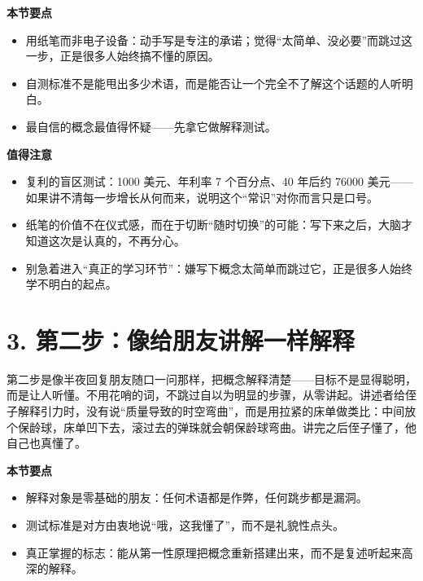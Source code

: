 \documentclass[UTF8,a4paper,11pt]{ctexart}
\begin{document}
\begin{keyconcept}
\textbf{本节要点}
\begin{itemize}
  \item 用纸笔而非电子设备：动手写是专注的承诺；觉得“太简单、没必要”而跳过这一步，正是很多人始终搞不懂的原因。
  \item 自测标准不是能甩出多少术语，而是能否让一个完全不了解这个话题的人听明白。
  \item 最自信的概念最值得怀疑——先拿它做解释测试。
\end{itemize}
\end{keyconcept}

\begin{keyconcept}
\textbf{值得注意}
\begin{itemize}
  \item 复利的盲区测试：1000 美元、年利率 7 个百分点、40 年后约 76000 美元——如果讲不清每一步增长从何而来，说明这个“常识”对你而言只是口号。
  \item 纸笔的价值不在仪式感，而在于切断“随时切换”的可能：写下来之后，大脑才知道这次是认真的，不再分心。
  \item 别急着进入“真正的学习环节”：嫌写下概念太简单而跳过它，正是很多人始终学不明白的起点。
\end{itemize}
\end{keyconcept}


\section*{3. 第二步：像给朋友讲解一样解释}

第二步是像半夜回复朋友随口一问那样，把概念解释清楚——目标不是显得聪明，而是让人听懂。不用花哨的词，不跳过自以为明显的步骤，从零讲起。讲述者给侄子解释引力时，没有说“质量导致的时空弯曲”，而是用拉紧的床单做类比：中间放个保龄球，床单凹下去，滚过去的弹珠就会朝保龄球弯曲。讲完之后侄子懂了，他自己也真懂了。

\begin{keyconcept}
\textbf{本节要点}
\begin{itemize}
  \item 解释对象是零基础的朋友：任何术语都是作弊，任何跳步都是漏洞。
  \item 测试标准是对方由衷地说“哦，这我懂了”，而不是礼貌性点头。
  \item 真正掌握的标志：能从第一性原理把概念重新搭建出来，而不是复述听起来高深的解释。
\end{itemize}
\end{keyconcept}
\end{document}
